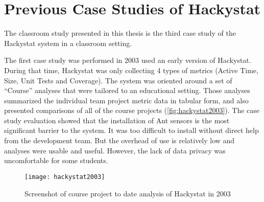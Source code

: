 

\section {Previous Case Studies of Hackystat}
The classroom study presented in this thesis is the third case study of the Hackystat system in a classroom setting. 

The first case study was performed in 2003 used an early version of Hackystat\cite{csdl2-03-13}. During that time, Hackystat was only collecting 4 types of metrics (Active Time, Size, Unit Tests and Coverage). The system was oriented around a set of ``Course'' analyses that were tailored to an educational setting. Those analyses summarized the individual team project metric data in tabular form, and also presented comparisons of all of the course projects (\autoref{fig:hackystat2003}). The case study evaluation showed that the installation of Ant sensors is the most significant barrier to the system. It was too difficult to install without direct help from the development team. But the overhead of use is relatively low and analyses were usable and useful. However, the lack of data privacy was uncomfortable for some students.

\begin{figure}[htbp]
   \centering
   \texttt{[image: hackystat2003]} 
   \caption{Screenshot of course project to date analysis of Hackystat in 2003}
   \label{fig:hackystat2003}
\end{figure}

